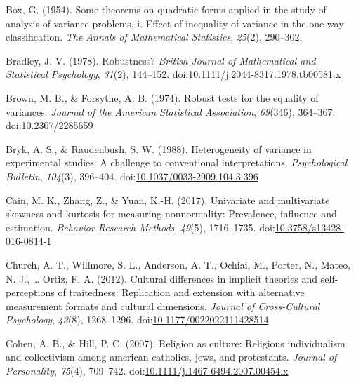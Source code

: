 \documentclass[man,floatsintext]{apa6}
\begin{document}
\leavevmode\hypertarget{ref-Box_1954}{}%
Box, G. (1954). Some theorems on quadratic forms applied in the study of analysis of variance problems, i. Effect of inequality of variance in the one-way classification. \emph{The Annals of Mathematical Statistics}, \emph{25}(2), 290--302.

\leavevmode\hypertarget{ref-Bradley_1978}{}%
Bradley, J. V. (1978). Robustness? \emph{British Journal of Mathematical and Statistical Psychology}, \emph{31}(2), 144--152. doi:\href{https://doi.org/10.1111/j.2044-8317.1978.tb00581.x}{10.1111/j.2044-8317.1978.tb00581.x}

\leavevmode\hypertarget{ref-Brown_and_Forsythe_1974}{}%
Brown, M. B., \& Forsythe, A. B. (1974). Robust tests for the equality of variances. \emph{Journal of the American Statistical Association}, \emph{69}(346), 364--367. doi:\href{https://doi.org/10.2307/2285659}{10.2307/2285659}

\leavevmode\hypertarget{ref-Bryk_and_Raudenbush_1988}{}%
Bryk, A. S., \& Raudenbush, S. W. (1988). Heterogeneity of variance in experimental studies: A challenge to conventional interpretations. \emph{Psychological Bulletin}, \emph{104}(3), 396--404. doi:\href{https://doi.org/10.1037/0033-2909.104.3.396}{10.1037/0033-2909.104.3.396}

\leavevmode\hypertarget{ref-Cain_et_al_2016}{}%
Cain, M. K., Zhang, Z., \& Yuan, K.-H. (2017). Univariate and multivariate skewness and kurtosis for measuring nonnormality: Prevalence, influence and estimation. \emph{Behavior Research Methods}, \emph{49}(5), 1716--1735. doi:\href{https://doi.org/10.3758/s13428-016-0814-1}{10.3758/s13428-016-0814-1}

\leavevmode\hypertarget{ref-Church_et_al_2012}{}%
Church, A. T., Willmore, S. L., Anderson, A. T., Ochiai, M., Porter, N., Mateo, N. J., \ldots{} Ortiz, F. A. (2012). Cultural differences in implicit theories and self-perceptions of traitedness: Replication and extension with alternative measurement formats and cultural dimensions. \emph{Journal of Cross-Cultural Psychology}, \emph{43}(8), 1268--1296. doi:\href{https://doi.org/10.1177/0022022111428514}{10.1177/0022022111428514}

\leavevmode\hypertarget{ref-Cohen_and_Hill_2007}{}%
Cohen, A. B., \& Hill, P. C. (2007). Religion as culture: Religious individualism and collectivism among american catholics, jews, and protestants. \emph{Journal of Personality}, \emph{75}(4), 709--742. doi:\href{https://doi.org/10.1111/j.1467-6494.2007.00454.x\%20}{10.1111/j.1467-6494.2007.00454.x }
\end{document}
